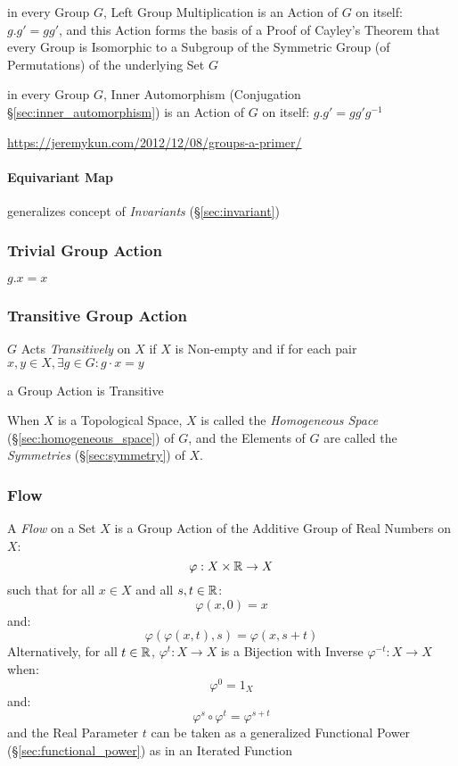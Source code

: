 in every Group $G$, Left Group Multiplication is an Action of $G$ on itself:
$g . g' = g g'$, and this Action forms the basis of a Proof of Cayley's Theorem
that every Group is Isomorphic to a Subgroup of the Symmetric Group (of
Permutations) of the underlying Set $G$

in every Group $G$, Inner Automorphism (Conjugation
\S\ref{sec:inner_automorphism}) is an Action of $G$ on itself:
$g . g' = g g' g^{-1}$

\url{https://jeremykun.com/2012/12/08/groups-a-primer/}



\paragraph{Equivariant Map}\label{sec:equivariant_map}\hfill

generalizes concept of \emph{Invariants} (\S\ref{sec:invariant})



\subsubsection{Trivial Group Action}\label{sec:trivial_action}

$g . x = x$



\subsubsection{Transitive Group Action}\label{sec:transitive_action}

$G$ Acts \emph{Transitively} on $X$ if $X$ is Non-empty and if for each pair
$x,y \in X, \exists g \in G : g \cdot x = y$

a Group Action is Transitive

When $X$ is a Topological Space, $X$ is called the \emph{Homogeneous Space}
(\S\ref{sec:homogeneous_space}) of $G$, and the Elements of $G$ are called the
\emph{Symmetries} (\S\ref{sec:symmetry}) of $X$.



\subsubsection{Flow}\label{sec:flow}

A \emph{Flow} on a Set $X$ is a Group Action of the Additive Group of Real
Numbers on $X$:
\[
  \varphi : X \times \mathbb{R} \rightarrow X
\]
such that for all $x \in X$ and all $s,t \in \mathbb{R}$:
\[
  \varphi(x,0) = x
\]
and:
\[
  \varphi(\varphi(x,t),s) = \varphi(x,s+t)
\]
Alternatively, for all $t \in \mathbb{R}$, $\varphi^t : X \rightarrow X$ is a
Bijection with Inverse $\varphi^{-t} : X \rightarrow X$ when:
\[
  \varphi^0 = 1_X
\]
and:
\[
  \varphi^s \circ \varphi^t = \varphi^{s + t}
\]
and the Real Parameter $t$ can be taken as a generalized Functional Power
(\S\ref{sec:functional_power}) as in an Iterated Function

